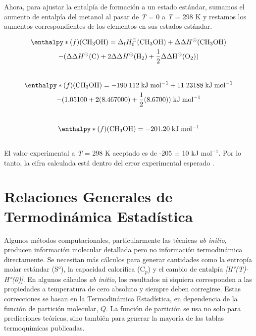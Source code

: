 Ahora, para ajustar la entalpía de formación a un estado estándar, sumamos el aumento de entalpía del metanol al pasar de \textit{T} = 0 a \textit{T} = 298 K y restamos los aumentos correspondientes de los elementos en sus estados estándar.

\begin{multline}
	\enthalpy*(f){} \mathrm{(CH_3OH)} = \Delta_{\mathrm{f}} H_{0}^{\circleddash}\mathrm{(CH_{3}OH)} + \Delta \Delta H^{\circleddash} \mathrm{(CH_{3}OH)} \\ - (\Delta \Delta H^{\circleddash} \mathrm{(C)} + 2 \Delta \Delta H^{\circleddash}(\mathrm{H_{2}}) + \frac{1}{2} \Delta \Delta \mathrm{H}^{\circleddash}\mathrm{(O_{2}))}
\label{eq:3.21}
\end{multline}\\

\begin{multline}
	\enthalpy*(f){} \mathrm{(CH_3OH)} = -190.112\;\mathrm{kJ\;mol^{-1}} + 11.23188\;\mathrm{kJ\;mol^{-1}}  \\ - (1.05100 + 2(8.467000) + \frac{1}{2} (8.6700))\;\mathrm{kJ\;mol^{-1}}
\label{eq:3.22}
\end{multline}\\

\begin{equation}
	\enthalpy*(f){} \mathrm{(CH_3OH)} = -201.20\;\mathrm{kJ\;mol^{-1}}
\label{eq:3.23}
\end{equation}\\

El valor experimental a \textit{T} = 298 K aceptado es de -205 $\pm$ 10 kJ mol$^{-1}$\cite{Afeefy2009}. Por lo tanto, la cifra calculada está dentro del error experimental esperado \cite{Lewars2016}.


\section{Relaciones Generales de Termodinámica Estadística}

Algunos métodos computacionales, particularmente las técnicas \textit{ab initio}, producen información molecular detallada pero no información termodinámica directamente. Se necesitan más cálculos para generar cantidades como la entropía molar estándar (S°), la capacidad calorífica (C$_{p}$) y el cambio de entalpía \textit{[H°(T)-H°(0)]}. En algunos cálculos \textit{ab initio}, los resultados ni siquiera corresponden a las propiedades a temperatura de cero absoluto y siempre deben corregirse. Estas correcciones se basan en la Termodinámica Estadística, en dependencia de la función de partición molecular, $Q$. La función de partición se usa no solo para predicciones teóricas, sino también para generar la mayoría de las tablas termoquímicas publicadas. 

